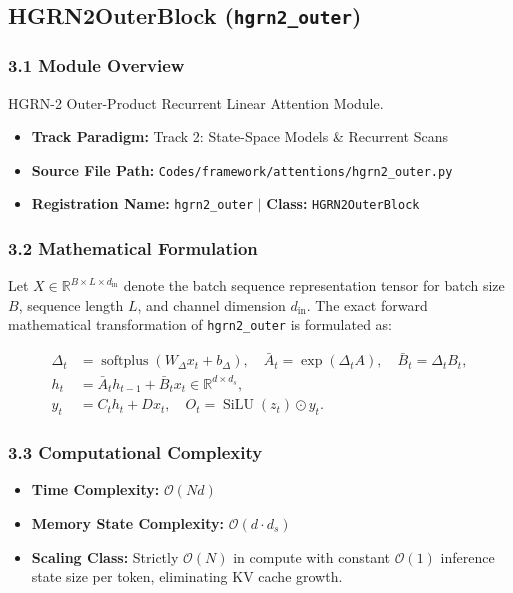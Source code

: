 \subsection{HGRN2OuterBlock (\texttt{hgrn2\_outer})}
\label{sec:app_module_hgrn2_outer}

\subsubsection*{3.1 Module Overview}
HGRN-2 Outer-Product Recurrent Linear Attention Module.
\begin{itemize}
    \item \textbf{Track Paradigm:} Track 2: State-Space Models \& Recurrent Scans
    \item \textbf{Source File Path:} \texttt{Codes/framework/attentions/hgrn2\_outer.py}
    \item \textbf{Registration Name:} \texttt{hgrn2\_outer} $\mid$ \textbf{Class:} \texttt{HGRN2OuterBlock}
\end{itemize}

\subsubsection*{3.2 Mathematical Formulation}
Let $X \in \mathbb{R}^{B \times L \times d_{\text{in}}}$ denote the batch sequence representation tensor for batch size $B$, sequence length $L$, and channel dimension $d_{\text{in}}$. The exact forward mathematical transformation of \texttt{hgrn2\_outer} is formulated as:

\begin{align}
\Delta_t &= \operatorname{softplus}(W_\Delta x_t + b_\Delta), \quad \bar{A}_t = \exp(\Delta_t A), \quad \bar{B}_t = \Delta_t B_t, \\
h_t &= \bar{A}_t h_{t-1} + \bar{B}_t x_t \in \mathbb{R}^{d \times d_s}, \\
y_t &= C_t h_t + D x_t, \quad O_t = \operatorname{SiLU}(z_t) \odot y_t.
\end{align}


\subsubsection*{3.3 Computational Complexity}
\begin{itemize}
    \item \textbf{Time Complexity:} $\mathcal{O}(N d)$
    \item \textbf{Memory State Complexity:} $\mathcal{O}(d \cdot d_s)$
    \item \textbf{Scaling Class:} Strictly $\mathcal{O}(N)$ in compute with constant $\mathcal{O}(1)$ inference state size per token, eliminating KV cache growth.
\end{itemize}

